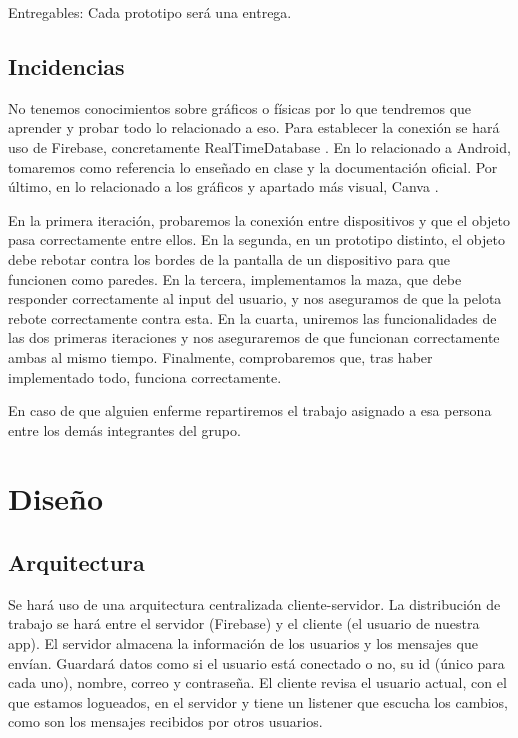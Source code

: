 \documentclass[a4paper,openright,12pt]{article}
\begin{document}
Entregables:
Cada prototipo será una entrega.

\subsection{Incidencias}
No tenemos conocimientos sobre gráficos o físicas por lo que tendremos que aprender y probar todo lo relacionado a eso. Para establecer la conexión se hará uso de Firebase, concretamente RealTimeDatabase \cite{misc-firebase}. En lo relacionado a Android, tomaremos como referencia lo enseñado en clase y la documentación oficial\cite{misc-android-developers}. Por último, en lo relacionado a los gráficos y apartado más visual, Canva \cite{misc-canva}.
\par
En la primera iteración, probaremos la conexión entre dispositivos y que el objeto pasa correctamente entre ellos.
En la segunda, en un prototipo distinto, el objeto debe rebotar contra los bordes de la pantalla de un dispositivo para que funcionen como paredes.
En la tercera, implementamos la maza, que debe responder correctamente al input del usuario, y nos aseguramos de que la pelota rebote correctamente contra esta.
En la cuarta, uniremos las funcionalidades de las dos primeras iteraciones y nos aseguraremos de que funcionan correctamente ambas al mismo tiempo. Finalmente, comprobaremos que, tras haber implementado todo, funciona correctamente.
\par
En caso de que alguien enferme repartiremos el trabajo asignado a esa persona entre los demás integrantes del grupo.

\section{Diseño}
\subsection{Arquitectura}
Se hará uso de una arquitectura centralizada cliente-servidor. La distribución de trabajo se hará entre el servidor (Firebase) y el cliente (el usuario de nuestra app). El servidor almacena la información de los usuarios y los mensajes que envían. Guardará datos como si el usuario está conectado o no, su id (único para cada uno), nombre, correo y contraseña. El cliente revisa el usuario actual, con el que estamos logueados, en el servidor y tiene un listener que escucha los cambios, como son los mensajes recibidos por otros usuarios.
\end{document}
